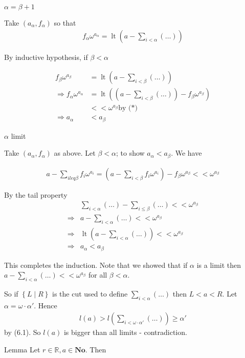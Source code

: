 \documentclass{article}
\newcommand{\R}{\mathbb{R}}
\newcommand{\No}{\mathbf{No}}
\newcommand{\paren}[1]{\left( #1 \right)}
\newcommand{\curly}[1]{\left\{ #1 \right\}}
\DeclareMathOperator{\lt}{lt}
\newcommand{\w}{\omega}
\begin{document}
$\alpha = \beta + 1$

Take $(a_\alpha, f_\alpha)$ so that
\begin{align*}
	f_\alpha\w^{a_\alpha} = \lt\paren{a - \sum_{i < \alpha}(\ldots)}
\end{align*}

By inductive hypothesis, if $\beta < \alpha$

\begin{align*}
	f_\beta\w^{a_\beta} &= \lt\paren{a - \sum_{i < \beta}(\ldots)} \\
	\Rightarrow f_\alpha\w^{a_\alpha} &= \lt\paren{\paren{a - \sum_{i < \beta}(\ldots)} - f_\beta\w^{a_\beta}} \\
	&<< \w^{a_\beta} \text{by (*)} \\
	\Rightarrow a_\alpha &< a_\beta
\end{align*}

$\alpha$ limit

Take $(a_\alpha, f_\alpha)$ as above.
Let $\beta < \alpha$; to show $a_\alpha < a_\beta$.
We have

\begin{align*}
	a - \sum_{i leq \beta} f_i \w^{a_i} = \paren{a - \sum_{i < \beta} f_i\w^{a_i}} - f_\beta\w^{a_\beta} << \w^{a_\beta}
\end{align*}

By the tail property
\begin{align*}
	&\sum_{i < \alpha} (\ldots) - \sum_{i \leq \beta} (\ldots) << \w^{a_\beta} \\
	\Rightarrow &a - \sum_{i < \alpha} (\ldots) << \w^{a_\beta} \\
	\Rightarrow &\lt\paren{a - \sum_{i < \alpha} (\ldots) } << \w^{a_\beta} \\
	\Rightarrow &a_\alpha < a_\beta
\end{align*}

This completes the induction.
Note that we showed that if $\alpha$ is a limit then $a - \sum_{i < \alpha} (\ldots) << \w^{a_\beta}$ for all $\beta < \alpha$.

So if $\curly{L \mid R}$ is the cut used to define $\sum_{i < \alpha} (\ldots)$ then $L < a < R$.
Let $\alpha = \w \cdot \alpha'$.
Hence 
\begin{align*}
	l(a) > l\paren{\sum_{i < \w\cdot\alpha'} (\ldots)} \geq \alpha'
\end{align*}
by (6.1).
So $l(a)$ is bigger than all limits - contradiction.

Lemma Let $r \in \R, a \in \No$. Then 
\end{document}
